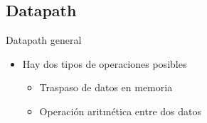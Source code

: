 \subsection{Datapath}
\begin{frame}{Datapath general}

  \begin{itemize}
    \item<1-> Hay dos tipos de operaciones posibles
    \begin{itemize}
      \Fontitit
      \item<2-> Traspaso de datos en memoria
      \item<3-> Operación aritmética entre dos datos
    \end{itemize}
  \end{itemize}
  
  \begin{columns}[T]
\end{columns}
\end{frame}
